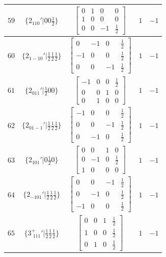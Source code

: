\documentclass[fleqn,8pt]{jsarticle}
\begin{document}
\begin{longtable}{ccccc}
$ 59 $ & $ \{2{}_{110}{}'|0 0 \frac{1}{2}\} $ & $ \begin{bmatrix} 0 & 1 & 0 & 0 \\ 1 & 0 & 0 & 0 \\ 0 & 0 & -1 & \frac{1}{2} \end{bmatrix} $ & $ 1 $ & $ -1 $ \\ \hline
$ 60 $ & $ \{2{}_{1-10}{}'|\frac{1}{2} \frac{1}{2} \frac{1}{2}\} $ & $ \begin{bmatrix} 0 & -1 & 0 & \frac{1}{2} \\ -1 & 0 & 0 & \frac{1}{2} \\ 0 & 0 & -1 & \frac{1}{2} \end{bmatrix} $ & $ 1 $ & $ -1 $ \\ \hline
$ 61 $ & $ \{2{}_{011}{}'|\frac{1}{2} 0 0\} $ & $ \begin{bmatrix} -1 & 0 & 0 & \frac{1}{2} \\ 0 & 0 & 1 & 0 \\ 0 & 1 & 0 & 0 \end{bmatrix} $ & $ 1 $ & $ -1 $ \\ \hline
$ 62 $ & $ \{2{}_{01-1}{}'|\frac{1}{2} \frac{1}{2} \frac{1}{2}\} $ & $ \begin{bmatrix} -1 & 0 & 0 & \frac{1}{2} \\ 0 & 0 & -1 & \frac{1}{2} \\ 0 & -1 & 0 & \frac{1}{2} \end{bmatrix} $ & $ 1 $ & $ -1 $ \\ \hline
$ 63 $ & $ \{2{}_{101}{}'|0 \frac{1}{2} 0\} $ & $ \begin{bmatrix} 0 & 0 & 1 & 0 \\ 0 & -1 & 0 & \frac{1}{2} \\ 1 & 0 & 0 & 0 \end{bmatrix} $ & $ 1 $ & $ -1 $ \\ \hline
$ 64 $ & $ \{2{}_{-101}{}'|\frac{1}{2} \frac{1}{2} \frac{1}{2}\} $ & $ \begin{bmatrix} 0 & 0 & -1 & \frac{1}{2} \\ 0 & -1 & 0 & \frac{1}{2} \\ -1 & 0 & 0 & \frac{1}{2} \end{bmatrix} $ & $ 1 $ & $ -1 $ \\ \hline
$ 65 $ & $ \{3^{+}_{\,\,111}{}'|\frac{1}{2} \frac{1}{2} \frac{1}{2}\} $ & $ \begin{bmatrix} 0 & 0 & 1 & \frac{1}{2} \\ 1 & 0 & 0 & \frac{1}{2} \\ 0 & 1 & 0 & \frac{1}{2} \end{bmatrix} $ & $ 1 $ & $ -1 $ \\ \hline

\end{longtable}
\end{document}
